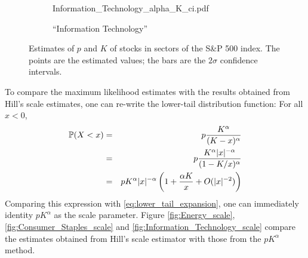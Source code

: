 \documentclass{article}
\begin{document}
\begin{figure}[htb!]
\begin{subfigure}[b]{0.45\linewidth}
                    {Information_Technology_alpha_K_ci.pdf}
                    \caption{``Information Technology''}
                    \label{fig:Information_Technology_alpha_K_ci}
  \end{subfigure}
  \caption{\small Estimates of $p$ and $K$ of stocks in sectors of the
    S\&P 500 index. The points are the estimated values; the bars are
    the $2\sigma$ confidence intervals.
  }
\end{figure}
To compare the maximum likelihood estimates with the results obtained
from Hill's scale estimates, one can re-write the lower-tail
distribution function: For all $x < 0$,
\begin{eqnarray*}
  \P(X < x)
  &=&
  p {K^\alpha \over (K - x)^\alpha} \\
  &=&
  p {K^\alpha |x|^{-\alpha} \over (1 - K/x)^\alpha} \\
  &=&
  p K^\alpha |x|^{-\alpha} \left(
  1 + {\alpha K \over x} + O(|x|^{-2})
  \right)
\end{eqnarray*}
Comparing this expression with \eqref{eq:lower_tail_expansion}, one
can immediately identity $p K^\alpha$ as the scale parameter. Figure
\ref{fig:Energy_scale}, \ref{fig:Consumer_Staples_scale} and
\ref{fig:Information_Technology_scale} compare the estimates obtained
from Hill's scale estimator with those from the $p K^\alpha$ method.
\end{document}
